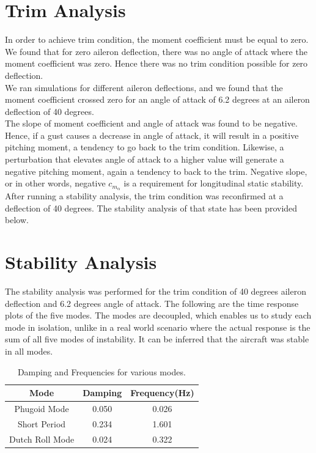 \section{Trim Analysis}
In order to achieve trim condition, the moment coefficient must be equal to zero. We found that for zero aileron deflection, there was no angle of attack where the moment coefficient was zero. Hence there was no trim condition possible for zero deflection.\\
We ran simulations for different aileron deflections, and we found that the moment coefficient crossed zero for an angle of attack of 6.2 degrees at an aileron deflection of 40 degrees.\\
The slope of moment coefficient and angle of attack was found to be negative. Hence, if a gust causes a decrease in angle of attack, it will result in a positive pitching moment, a tendency to go back to the trim condition. Likewise, a perturbation that elevates angle of attack to a higher value will generate a negative pitching moment, again a tendency to back to the trim. Negative slope, or in other words, negative $c_{m_\alpha}$ is a requirement for longitudinal static stability.\\
After running a stability analysis, the trim condition was reconfirmed at a deflection of 40 degrees. The stability analysis of that state has been provided below.\\

\section{Stability Analysis}
The stability analysis was performed for the trim condition of 40 degrees aileron deflection and 6.2 degrees angle of attack.
The following are the time response plots of the five modes. The modes are decoupled, which enables us to study each mode in isolation, unlike in a real world scenario where the actual response is the sum of all five modes of instability.
It can be inferred that the aircraft was stable in all modes.
\begin{table}[H]
\begin{center}
\begin{tabular}{ |c| c| c| }
\hline
 Mode & Damping & Frequency(Hz) \\ 
 \hline
 Phugoid Mode & 0.050 & 0.026 \\ 
 \hline
 Short Period & 0.234 & 1.601 \\ 
 \hline
 Dutch Roll Mode & 0.024 & 0.322 \\
 \hline
\end{tabular}
\end{center}
\caption{Damping and Frequencies for various modes.}
\end{table}

